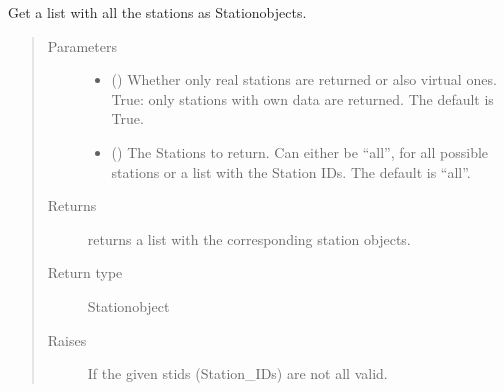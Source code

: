 \documentclass[letterpaper,10pt,english]{sphinxmanual}
\begin{document}
\begin{fulllineitems}
\begin{fulllineitems}
\label{\detokenize{weatherDB:weatherDB.stations.StationsBase.get_stations}}
\sphinxAtStartPar
Get a list with all the stations as Station\sphinxhyphen{}objects.
\begin{quote}\begin{description}
\item[{Parameters}] \leavevmode\begin{itemize}
\item {} 
\sphinxAtStartPar
{} (\sphinxstyleliteralemphasis{\sphinxupquote{, }}) \textendash{} Whether only real stations are returned or also virtual ones.
True: only stations with own data are returned.
The default is True.

\item {} 
\sphinxAtStartPar
{} (\sphinxstyleliteralemphasis{\sphinxupquote{, }}) \textendash{} The Stations to return.
Can either be “all”, for all possible stations
or a list with the Station IDs.
The default is “all”.

\end{itemize}

\item[{Returns}] \leavevmode
\sphinxAtStartPar
returns a list with the corresponding station objects.

\item[{Return type}] \leavevmode
\sphinxAtStartPar
Station\sphinxhyphen{}object

\item[{Raises}] \leavevmode
\sphinxAtStartPar
{} \textendash{} If the given stids (Station\_IDs) are not all valid.

\end{description}\end{quote}

\end{fulllineitems}


\end{fulllineitems}
\end{document}
